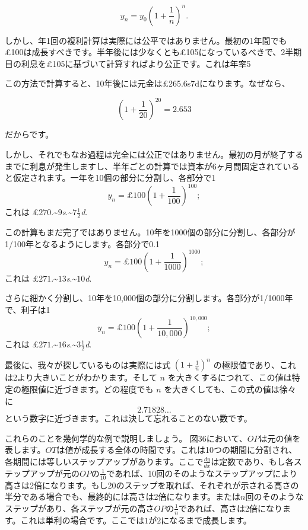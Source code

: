 \documentclass[a4paper,11pt,openany]{ltjsbook}
\providecommand{\DPtypo}[2]{#2}%
\begin{document}
\[
y_n = y_0 \left(1 + \frac{1}{n}\right)^n.
\]

しかし、年1回の複利計算は実際には公平ではありません。最初の1年間でも£100は成長すべきです。半年後には少なくとも£105になっているべきで、2半期目の利息を£105に基づいて計算すればより公正です。これは年率5%

この方法で計算すると、10年後には元金は£265.6s7dになります。なぜなら、

\[
(1 + \frac{1}{20})^{20} = 2.653
\]

だからです。

しかし、それでもなお過程は完全には公正ではありません。最初の月が終了するまでに利息が発生しますし、半年ごとの計算では資本が6ヶ月間固定されていると仮定されます。一年を10個の部分に分割し、各部分で1%
\[
y_n = £100 \left( 1 + \frac{1}{100} \right)^{100};
\]
これは
\DPtypo{£$270$.\textasciitilde{}$8$\textit{s}.}
       {£$270$.\textasciitilde{}$9$\textit{s}.\textasciitilde{}$7\frac{1}{2}$\textit{d}.}

この計算もまだ完了ではありません。10年を1000個の部分に分割し、各部分が1/100年となるようにします。各部分で0.1%
\[
y_n = £100 \left( 1 + \frac{1}{1000} \right)^{1000};
\]
これは
\DPtypo{£$271$.\textasciitilde{}$14$\textit{s}.\textasciitilde{}$2\frac{1}{2}$\textit{d}.}
       {£$271$.\textasciitilde{}$13$\textit{s}.\textasciitilde{}$10$\textit{d}.}

さらに細かく分割し、10年を10,000個の部分に分割します。各部分が1/1000年で、利子は1%
\[
y_n = £100 \left( 1 + \frac{1}{10,000} \right)^{10,000};
\]
これは
\DPtypo{£$271$.\textasciitilde{}$16$\textit{s}.\textasciitilde{}$4$\textit{d}.}
       {£$271$.\textasciitilde{}$16$\textit{s}.\textasciitilde{}$3\frac{1}{2}$\textit{d}.}

最後に、我々が探しているものは実際には式 $\left(1 + \frac{1}{n}\right)^n$ の極限値であり、これは2より大きいことがわかります。そして $n$ を大きくするにつれて、この値は特定の極限値に近づきます。どの程度でも $n$ を大きくしても、この式の値は徐々に
\[
2.71828\ldots
\]
という数字に近づきます。これは決して忘れることのない数です。

これらのことを幾何学的な例で説明しましょう。
図36において、$OP$は元の値を表します。$OT$は値が成長する全体の時間です。これは10つの期間に分割され、各期間には等しいステップアップがあります。ここで$\frac{dy}{dx}$は定数であり、もし各ステップアップが元の$OP$の$\frac{1}{10}$であれば、10回のそのようなステップアップにより高さは2倍になります。もし20のステップを取れば、それぞれが示される高さの半分である場合でも、最終的には高さは2倍になります。または$n$回のそのようなステップがあり、各ステップが元の高さ$OP$の$\frac{1}{n}$であれば、高さは2倍になります。これは単利の場合です。ここでは$1$が$2$になるまで成長します。
\end{document}
